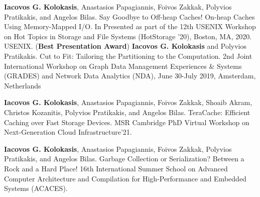 



\begin{cventries}
\vspace{-15pt}
  \cventry
    {}
    {}
    {}
    {}
    {\textbf{Iacovos G. Kolokasis}, Anastasios Papagiannis, Foivos
    Zakkak, Polyvios Pratikakis, and Angelos Bilas.%
    Say Goodbye to Off-heap Caches! On-heap Caches Using Memory-Mapped
    I/O. In Presented as part of the 12th USENIX Workshop on Hot
    Topics in Storage and File Systems (HotStorage '20), Boston, MA,
    2020. USENIX. (\textbf{Best Presentation Award})}
  {}
  \cventry
    {}
    {}
    {}
    {}
    {\textbf{Iacovos G. Kolokasis} and Polyvios
  Pratikakis. Cut to Fit: Tailoring the Partitioning to the
  Computation. 2nd Joint International Workshop on Graph Data
  Management Experiences \& Systems (GRADES) and Network Data
  Analytics (NDA), June 30-July 2019, Amsterdam, Netherlands}
  {}

\end{cventries}


\vspace{-15pt}
\begin{cventries}
  \cventry
    {}
    {}
    {}
    {}
    {\textbf{Iacovos G. Kolokasis}, Anastasios Papagiannis, Foivos
    Zakkak, Shoaib Akram, Christos Kozanitis, Polyvios Pratikakis, and Angelos Bilas.%
	TeraCache: Efficient Caching over Fast Storage Devices. 
	MSR Cambridge PhD Virtual Workshop on Next-Generation Cloud Infrastructure'21.
	}
  {}

  \cventry
    {}
    {}
    {}
    {}
    {\textbf{Iacovos G. Kolokasis}, Anastasios Papagiannis, Foivos
    Zakkak, Polyvios Pratikakis, and Angelos Bilas.%
	Garbage
    Collection or Serialization? Between a Rock and a Hard Place! 
    16th International Summer School on Advanced Computer Architecture
    and Compilation for High-Performance and Embedded Systems
    (ACACES).}
  {}

\end{cventries}
      

